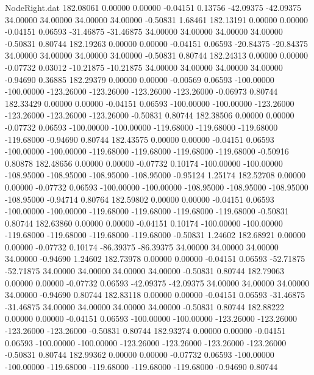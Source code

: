 \begin{filecontents}{NodeRight.dat}
 182.08061    0.00000    0.00000    -0.04151    0.13756  -42.09375  -42.09375   34.00000   34.00000   34.00000   34.00000   -0.50831    1.68461
 182.13191    0.00000    0.00000    -0.04151    0.06593  -31.46875  -31.46875   34.00000   34.00000   34.00000   34.00000   -0.50831    0.80744
 182.19263    0.00000    0.00000    -0.04151    0.06593  -20.84375  -20.84375   34.00000   34.00000   34.00000   34.00000   -0.50831    0.80744
 182.24313    0.00000    0.00000    -0.07732    0.03012  -10.21875  -10.21875   34.00000   34.00000   34.00000   34.00000   -0.94690    0.36885
 182.29379    0.00000    0.00000    -0.00569    0.06593 -100.00000 -100.00000 -123.26000 -123.26000 -123.26000 -123.26000   -0.06973    0.80744
 182.33429    0.00000    0.00000    -0.04151    0.06593 -100.00000 -100.00000 -123.26000 -123.26000 -123.26000 -123.26000   -0.50831    0.80744
 182.38506    0.00000    0.00000    -0.07732    0.06593 -100.00000 -100.00000 -119.68000 -119.68000 -119.68000 -119.68000   -0.94690    0.80744
 182.43575    0.00000    0.00000    -0.04151    0.06593 -100.00000 -100.00000 -119.68000 -119.68000 -119.68000 -119.68000   -0.50916    0.80878
 182.48656    0.00000    0.00000    -0.07732    0.10174 -100.00000 -100.00000 -108.95000 -108.95000 -108.95000 -108.95000   -0.95124    1.25174
 182.52708    0.00000    0.00000    -0.07732    0.06593 -100.00000 -100.00000 -108.95000 -108.95000 -108.95000 -108.95000   -0.94714    0.80764
 182.59802    0.00000    0.00000    -0.04151    0.06593 -100.00000 -100.00000 -119.68000 -119.68000 -119.68000 -119.68000   -0.50831    0.80744
 182.63860    0.00000    0.00000    -0.04151    0.10174 -100.00000 -100.00000 -119.68000 -119.68000 -119.68000 -119.68000   -0.50831    1.24602
 182.68921    0.00000    0.00000    -0.07732    0.10174  -86.39375  -86.39375   34.00000   34.00000   34.00000   34.00000   -0.94690    1.24602
 182.73978    0.00000    0.00000    -0.04151    0.06593  -52.71875  -52.71875   34.00000   34.00000   34.00000   34.00000   -0.50831    0.80744
 182.79063    0.00000    0.00000    -0.07732    0.06593  -42.09375  -42.09375   34.00000   34.00000   34.00000   34.00000   -0.94690    0.80744
 182.83118    0.00000    0.00000    -0.04151    0.06593  -31.46875  -31.46875   34.00000   34.00000   34.00000   34.00000   -0.50831    0.80744
 182.88222    0.00000    0.00000    -0.04151    0.06593 -100.00000 -100.00000 -123.26000 -123.26000 -123.26000 -123.26000   -0.50831    0.80744
 182.93274    0.00000    0.00000    -0.04151    0.06593 -100.00000 -100.00000 -123.26000 -123.26000 -123.26000 -123.26000   -0.50831    0.80744
 182.99362    0.00000    0.00000    -0.07732    0.06593 -100.00000 -100.00000 -119.68000 -119.68000 -119.68000 -119.68000   -0.94690    0.80744

\end{filecontents}
